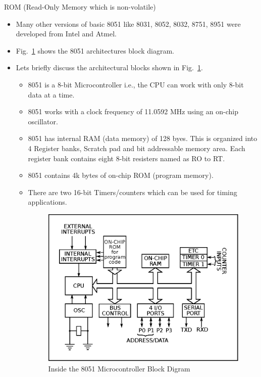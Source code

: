 ROM (Read-Only Memory which is non-volatile)
\begin{itemize}
\item Many other versions of basic 8051 like 8031, 8052, 8032, 8751, 8951 were developed from Intel and Atmel.

\item Fig.~\ref{fig7.1} shows the 8051 architectures block diagram.

\item Lets briefly discuss the architectural blocks shown in Fig.~\ref{fig7.1}.
\begin{itemize}
\item 8051 is a 8-bit Microcontroller i.e., the CPU can work with only 8-bit data at a time.

\item 8051 works with a clock frequency of 11.0592 MHz using an on-chip oscillator.

\item 8051 has internal RAM (data memory) of 128 byes. This is organized into 4 Register banks, Scratch pad and bit addressable memory area. Each register bank contains eight 8-bit resisters named as RO to RT.

\item 8051 contains 4k bytes of on-chip ROM (program memory).

\item There are two 16-bit Timers/counters which can be used for timing applications.
\begin{figure}[H]
\centering
\includegraphics[scale=.95]{chap7/fig7.1.eps}
\caption{Inside the 8051 Microcontroller Block Digram}\label{fig7.1}
\end{figure}


\end{itemize}
\end{itemize}
